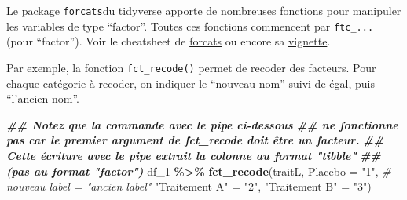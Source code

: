 \documentclass[
]{book}
\newenvironment{Shaded}{\begin{snugshade}}{\end{snugshade}}
\newcommand{\AttributeTok}[1]{\textcolor[rgb]{0.13,0.29,0.53}{#1}}
\newcommand{\CommentTok}[1]{\textcolor[rgb]{0.56,0.35,0.01}{\textit{#1}}}
\newcommand{\DocumentationTok}[1]{\textcolor[rgb]{0.56,0.35,0.01}{\textbf{\textit{#1}}}}
\newcommand{\FunctionTok}[1]{\textcolor[rgb]{0.13,0.29,0.53}{\textbf{#1}}}
\newcommand{\NormalTok}[1]{#1}
\newcommand{\OtherTok}[1]{\textcolor[rgb]{0.56,0.35,0.01}{#1}}
\newcommand{\SpecialCharTok}[1]{\textcolor[rgb]{0.81,0.36,0.00}{\textbf{#1}}}
\newcommand{\StringTok}[1]{\textcolor[rgb]{0.31,0.60,0.02}{#1}}
\begin{document}
Le package \href{https://forcats.tidyverse.org/index.html}{\texttt{forcats}}du tidyverse apporte de nombreuses fonctions pour manipuler les variables de type ``factor''. Toutes ces fonctions commencent par \texttt{ftc\_...} (pour ``factor''). Voir le cheatsheet de \href{https://raw.githubusercontent.com/rstudio/cheatsheets/main/factors.pdf}{forcats} ou encore sa \href{https://forcats.tidyverse.org/articles/forcats.html}{vignette}.

Par exemple, la fonction \texttt{fct\_recode()} permet de recoder des facteurs. Pour chaque catégorie à recoder, on indiquer le ``nouveau nom'' suivi de égal, puis ``l'ancien nom''.

\begin{Shaded}
\end{Shaded}

\begin{Shaded}
\begin{Highlighting}[]
\DocumentationTok{\#\# Notez que la commande avec le pipe ci{-}dessous }
\DocumentationTok{\#\# ne fonctionne pas car le premier argument de fct\_recode doit être un facteur. }
\DocumentationTok{\#\# Cette écriture avec le pipe extrait la colonne au format "tibble" }
\DocumentationTok{\#\# (pas au format "factor") }
\NormalTok{df\_1 }\SpecialCharTok{\%\textgreater{}\%} \FunctionTok{fct\_recode}\NormalTok{(traitL, }
                    \AttributeTok{Placebo =} \StringTok{"1"}\NormalTok{, }\CommentTok{\# nouveau label = "ancien label"}
                    \StringTok{"Traitement A"} \OtherTok{=} \StringTok{"2"}\NormalTok{, }
                    \StringTok{"Traitement B"} \OtherTok{=} \StringTok{"3"}\NormalTok{) }
\end{Highlighting}
\end{Shaded}
\end{document}
